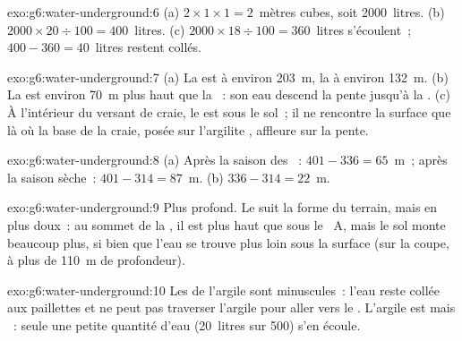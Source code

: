 \begin{solution}{exo:g6:water-underground:6}
(a) $2 \times 1 \times 1 = 2$~mètres cubes, soit 2000~litres.
(b) $2000 \times 20 \div 100 = 400$~litres. (c) $2000 \times 18 \div 100 =
360$~litres s'écoulent~; $400 - 360 = 40$~litres restent collés.
\end{solution}

\begin{solution}{exo:g6:water-underground:7}
(a) La  est à environ 203~m, la  à environ 132~m. (b) La
 est environ 70~m plus haut que la ~: son eau descend la
pente jusqu'à la . (c) À l'intérieur du versant de craie, le  est sous le sol~; il ne rencontre la surface que là où la base
de la craie, posée sur l'argilite , affleure sur la pente.
\end{solution}

\begin{solution}{exo:g6:water-underground:8}
(a) Après la saison des ~: $401 - 336 = 65$~m~; après la saison
sèche~: $401 - 314 = 87$~m. (b) $336 - 314 = 22$~m.
\end{solution}

\begin{solution}{exo:g6:water-underground:9}
Plus profond. Le  suit la forme du terrain, mais en plus
doux~: au sommet de la , il est plus haut que sous le ~A, mais
le sol monte beaucoup plus, si bien que l'eau se trouve plus loin sous la
surface (sur la coupe, à plus de 110~m de profondeur).
\end{solution}

\begin{solution}{exo:g6:water-underground:10}
Les  de l'argile sont minuscules~: l'eau reste collée aux paillettes
et ne peut pas traverser l'argile pour aller vers le . L'argile est
 mais ~: seule une petite quantité d'eau (20~litres sur
500) s'en écoule.
\end{solution}


